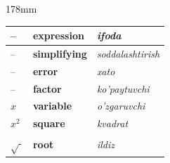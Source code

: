\documentclass[a4paper]{article}
\begin{document}
\begin{textblock*}{178mm}
{\begin{tabular}{|>{\centering\arraybackslash}p{22mm}|p{68mm}|p{72mm}|}
\rowcolor{badge!18}
-- & \textbf{expression} & \textit{ifoda} \\ \hline
-- & \textbf{simplifying} & \textit{soddalashtirish} \\ \hline
\rowcolor{badge!18}
-- & \textbf{error} & \textit{xato} \\ \hline
-- & \textbf{factor} & \textit{ko'paytuvchi} \\ \hline
\rowcolor{badge!18}
$x$ & \textbf{variable} & \textit{o'zgaruvchi} \\ \hline
$x^2$ & \textbf{square} & \textit{kvadrat} \\ \hline
\rowcolor{badge!18}
$\sqrt{\ }$ & \textbf{root} & \textit{ildiz} \\ \hline
\end{tabular}
}
\end{textblock*}
\end{document}
